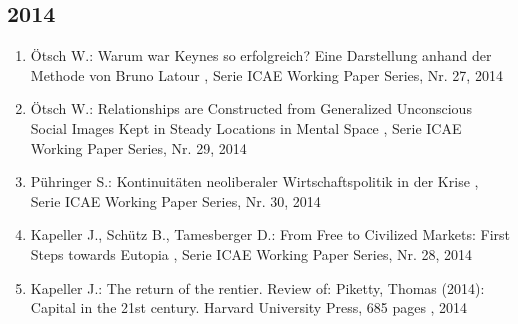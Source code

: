  \subsection*{2014} 
 \begin{enumerate}[leftmargin=*, labelsep=0.5cm] 
	 \item Ötsch W.:  Warum war Keynes so erfolgreich? Eine Darstellung anhand der Methode von Bruno Latour  , Serie ICAE Working Paper Series, Nr. 27, 2014
	 \item Ötsch W.:  Relationships are Constructed from Generalized Unconscious Social Images Kept in Steady Locations in Mental Space  , Serie ICAE Working Paper Series, Nr. 29, 2014
	 \item Pühringer S.:  Kontinuitäten neoliberaler Wirtschaftspolitik in der Krise  , Serie ICAE Working Paper Series, Nr. 30, 2014
	 \item Kapeller J., Schütz B., Tamesberger D.:  From Free to Civilized Markets: First Steps towards Eutopia  , Serie ICAE Working Paper Series, Nr. 28, 2014
	 \item Kapeller J.:  The return of the rentier. Review of: Piketty, Thomas (2014): Capital in the 21st century. Harvard University Press, 685 pages  , 2014
\end{enumerate} 
